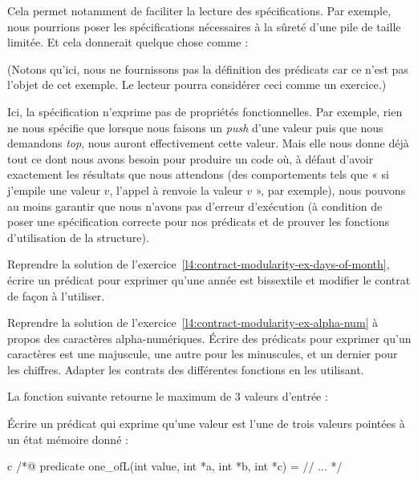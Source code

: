 Cela permet notamment de faciliter la lecture des spécifications. Par exemple, nous
pourrions poser les spécifications nécessaires à la sûreté d'une pile de taille
limitée. Et cela donnerait quelque chose comme :




(Notons qu'ici, nous ne fournissons pas la définition des prédicats car ce n'est
pas l'objet de cet exemple. Le lecteur pourra considérer ceci comme un exercice.)

Ici, la spécification n'exprime pas de propriétés fonctionnelles. Par exemple,
rien ne nous spécifie que lorsque nous faisons un \textit{push} d'une valeur puis que nous
demandons \textit{top}, nous auront effectivement cette valeur. Mais elle nous donne
déjà tout ce dont nous avons besoin pour produire un code où, à défaut d'avoir
exactement les résultats que nous attendons (des comportements tels que « si
j'empile une valeur $v$, l'appel à  renvoie la valeur $v$ », par exemple), nous
pouvons au moins garantir que nous n'avons pas d'erreur d'exécution (à condition
de poser une spécification correcte pour nos prédicats et de prouver les fonctions
d'utilisation de la structure).






Reprendre la solution de l'exercice~\ref{l4:contract-modularity-ex-days-of-month},
écrire un prédicat pour exprimer qu'une année est bissextile et modifier le contrat
de façon à l'utiliser.




Reprendre la solution de l'exercice~\ref{l4:contract-modularity-ex-alpha-num} à
propos des caractères alpha-numériques. Écrire des prédicats pour exprimer qu'un
caractères est une majuscule, une autre pour les minuscules, et un dernier pour les
chiffres. Adapter les contrats des différentes fonctions en les utilisant.




La fonction suivante retourne le maximum de 3 valeurs d'entrée :




Écrire un prédicat qui exprime qu'une valeur est l'une de trois valeurs pointées
à un état mémoire donné :


\begin{CodeBlock}{c}
  /*@
    predicate one_of{L}(int value, int *a, int *b, int *c) =
      // ...
  */
\end{CodeBlock}


